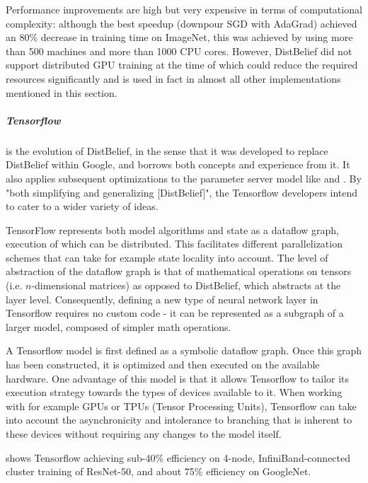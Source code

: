 \begin{itemize}
	Performance improvements are high but very expensive in terms of computational complexity: although the best speedup (downpour SGD with AdaGrad) achieved an 80\% decrease in training time on ImageNet, this was achieved by using more than 500 machines and more than 1000 CPU cores. However, DistBelief did not support distributed GPU training at the time of \citet{DistBelief2012} which could reduce the required resources significantly and is used in fact in almost all other implementations mentioned in this section.
\end{itemize}

\subparagraph{Tensorflow \citep{Tensorflow2015}\citep{Tensorflow2016}}
is the evolution of DistBelief, in the sense that it was developed to replace DistBelief within Google, and borrows both concepts and experience from it. It also applies subsequent optimizations to the parameter server model like \citet{Chilimbi14} and \citet{Li2014Comms}\citep{Li2014Scaling}. By "both simplifying and generalizing [DistBelief]"\citep{Tensorflow2016}, the Tensorflow developers intend to cater to a wider variety of ideas.

TensorFlow represents both model algorithms and state as a dataflow graph, execution of which can be distributed. This facilitates different parallelization schemes that can take for example state locality into account. The level of abstraction of the dataflow graph is that of mathematical operations on tensors (i.e. $n$-dimensional matrices) as opposed to DistBelief, which abstracts at the layer level. Consequently, defining a new type of neural network layer in Tensorflow requires no custom code - it can be represented as a subgraph of a larger model, composed of simpler math operations.

A Tensorflow model is first defined as a symbolic dataflow graph. Once this graph has been constructed, it is optimized and then executed on the available hardware. One advantage of this model is that it allows Tensorflow to tailor its execution strategy towards the types of devices available to it. When working with for example GPUs or TPUs (Tensor Processing Units\citep{TPU2017}), Tensorflow can take into account the asynchronicity and intolerance to branching that is inherent to these devices without requiring any changes to the model itself.

\citet{Shaohuai2017} shows Tensorflow achieving sub-40\% efficiency on 4-node, InfiniBand-connected cluster training of ResNet-50\citet{He2015}, and about 75\% efficiency on GoogleNet\citep{Szegedy2014}. 


